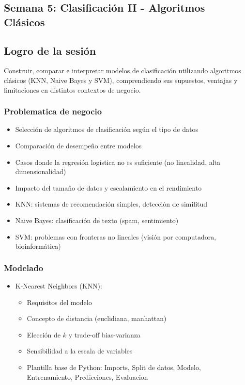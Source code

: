 \documentclass[12pt,a4paper,openany,oneside]{book}
\begin{document}
\begin{itemize}
\chapter{Semana 5: Clasificación II - Algoritmos Clásicos}

\section{Logro de la sesión}
Construir, comparar e interpretar modelos de clasificación utilizando algoritmos clásicos (KNN, Naive Bayes y SVM), comprendiendo sus supuestos, ventajas y limitaciones en distintos contextos de negocio.

\subsection{Problematica de negocio}
\begin{itemize}
    \item Selección de algoritmos de clasificación según el tipo de datos
    \item Comparación de desempeño entre modelos
    \item Casos donde la regresión logística no es suficiente (no linealidad, alta dimensionalidad)
    \item Impacto del tamaño de datos y escalamiento en el rendimiento
\item KNN: sistemas de recomendación simples, detección de similitud
    \item Naive Bayes: clasificación de texto (spam, sentimiento)
    \item SVM: problemas con fronteras no lineales (visión por computadora, bioinformática)
\end{itemize}

\subsection{Modelado}
\begin{itemize}
    \item K-Nearest Neighbors (KNN):
    \begin{itemize}
        \item Requisitos del modelo
        \item Concepto de distancia (euclidiana, manhattan)
        \item Elección de $k$ y trade-off bias-varianza
        \item Sensibilidad a la escala de variables
        \item Plantilla base de Python: Imports, Split de datos, Modelo, Entrenamiento, Predicciones, Evaluacion
    \end{itemize}
    

\end{itemize}
\end{itemize}
\end{document}
